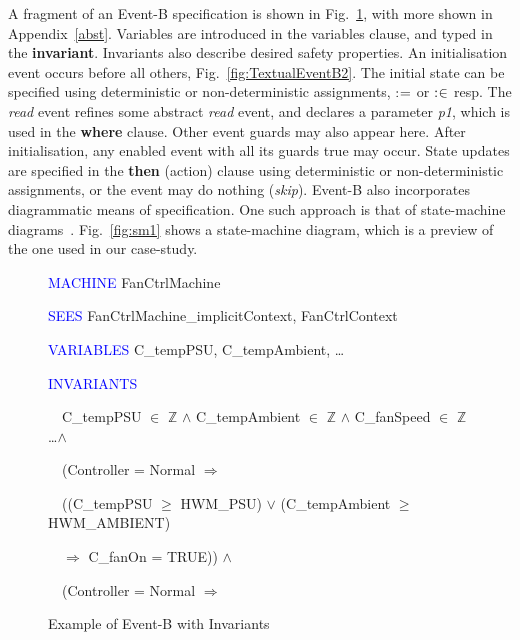 \documentclass{llncs}%
\begin{document}
A fragment of an Event-B specification is shown in Fig.~\ref{fig:TextualEventB}, with more shown in Appendix~\ref{abst}. Variables are introduced in the variables clause, and typed in the \textbf{invariant}. Invariants also describe desired safety properties. An initialisation event occurs before all others, Fig.~\ref{fig:TextualEventB2}. The initial state can be specified using deterministic or non-deterministic assignments, $\mathrel{:\mkern1mu=}$ or $\mathrel{:\mkern1mu\in}$ resp.  The \emph{read} event refines some abstract \emph{read} event, and declares a parameter \emph{p1}, which is used in the \textbf{where} clause. Other event guards may also appear here. After initialisation, any enabled event with all its guards true may occur. State updates are specified in the \textbf{then} (action) clause using deterministic or non-deterministic assignments, or the event may do nothing (\emph{skip}). Event-B also incorporates diagrammatic means of specification. One such approach is that of state-machine diagrams~\cite{snookIUMLB}. Fig.~\ref{fig:sm1} shows a state-machine diagram, which is a preview of the one used in our case-study.  
%
%
%
\begin{figure}
\centering
\begin{minipage}{0.9\linewidth}
\textcolor{blue}{MACHINE} FanCtrlMachine 

\textcolor{blue}{SEES} FanCtrlMachine\_implicitContext, FanCtrlContext 

\textcolor{blue}{VARIABLES} C\_tempPSU, C\_tempAmbient, \ldots \ \  \ 

\textcolor{blue}{INVARIANTS}

\ \ C\_tempPSU ${\in}$ $\mathbb{Z}$  ${\wedge}$ C\_tempAmbient ${\in}$ $\mathbb{Z}$  ${\wedge}$ C\_fanSpeed ${\in}$ $\mathbb{Z}$ \ldots ${\wedge}$ \ 

\ \ (Controller = Normal $\Rightarrow $ \

 \ \ ((C\_tempPSU ${\geq}$ HWM\_PSU) ${\vee}$ (C\_tempAmbient ${\geq}$
HWM\_AMBIENT)\

\ \ \quad $\Rightarrow $ C\_fanOn = TRUE)) ${\wedge}$\ \  \ 

\ \ (Controller = Normal $\Rightarrow $
\end{minipage}
	\caption{Example of Event-B with Invariants}
	\label{fig:TextualEventB}
\end{figure}
%
%
%
\end{document}

